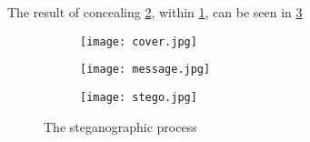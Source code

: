 The result of concealing \ref{img2}, within \ref{img1}, can be seen in \ref{img3}

\begin{figure}[]
	\centering
	\begin{subfigure}[b]{.3\linewidth}
		\texttt{[image: cover.jpg]}
		\label{img1}
	\end{subfigure}
	\hspace{.02\linewidth}
	\begin{subfigure}[b]{.3\linewidth}
		\texttt{[image: message.jpg]}
		\label{img2}
	\end{subfigure}
	\hspace{.02\linewidth}

	\begin{subfigure}[b]{.4\linewidth}
		\texttt{[image: stego.jpg]}
		\label{img3}
	\end{subfigure}
	\caption{The steganographic process}\label{LSBDemo}
\end{figure} 


